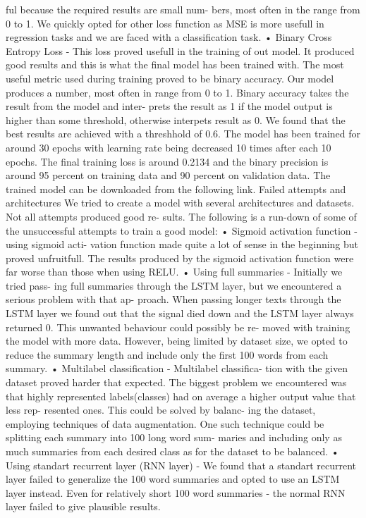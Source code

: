 ful because the required results are small num-
bers, most often in the range from 0 to 1. We
quickly opted for other loss function as MSE is
more usefull in regression tasks and we are faced
with a classification task.
• Binary Cross Entropy Loss - This loss proved
usefull in the training of out model. It produced
good results and this is what the final model has
been trained with.
The most useful metric used during training
proved to be binary accuracy. Our model produces
a number, most often in range from 0 to 1. Binary
accuracy takes the result from the model and inter-
prets the result as 1 if the model output is higher
than some threshold, otherwise interpets result as 0.
We found that the best results are achieved with a
threshhold of 0.6.
The model has been trained for around 30 epochs
with learning rate being decreased 10 times after each
10 epochs.
The final training loss is around 0.2134 and the
binary precision is around 95 percent on training
data and 90 percent on validation data.
The trained model can be downloaded from the
following link.
Failed attempts and architectures
We tried to create a model with several architectures
and datasets. Not all attempts produced good re-
sults. The following is a run-down of some of the
unsuccessful attempts to train a good model:
• Sigmoid activation function - using sigmoid acti-
vation function made quite a lot of sense in the
beginning but proved unfruitfull. The results
produced by the sigmoid activation function
were far worse than those when using RELU.
• Using full summaries - Initially we tried pass-
ing full summaries through the LSTM layer, but
we encountered a serious problem with that ap-
proach. When passing longer texts through the
LSTM layer we found out that the signal died
down and the LSTM layer always returned 0.
This unwanted behaviour could possibly be re-
moved with training the model with more data.
However, being limited by dataset size, we opted
to reduce the summary length and include only
the first 100 words from each summary.
• Multilabel classification - Multilabel classifica-
tion with the given dataset proved harder that
expected. The biggest problem we encountered
was that highly represented labels(classes) had
on average a higher output value that less rep-
resented ones. This could be solved by balanc-
ing the dataset, employing techniques of data
augmentation. One such technique could be
splitting each summary into 100 long word sum-
maries and including only as much summaries
from each desired class as for the dataset to be
balanced.
• Using standart recurrent layer (RNN layer) - We
found that a standart recurrent layer failed to
generalize the 100 word summaries and opted
to use an LSTM layer instead. Even for relatively
short 100 word summaries - the normal RNN
layer failed to give plausible results.